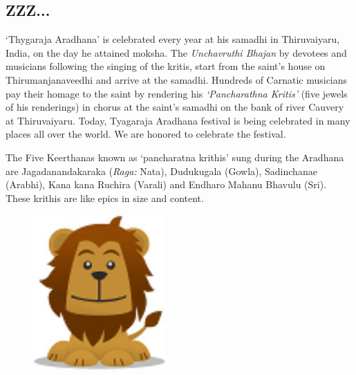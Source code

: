 \documentclass[10pt,letterpaper,twocolumn,landscape]{article}
\begin{document}
\begin{framed}
\section*{ZZZ...}
`Thygaraja Aradhana' is celebrated every year 
at his samadhi in Thiruvaiyaru, India, on the day he attained moksha. 
The {\em Unchavruthi Bhajan} by devotees and musicians 
following the singing of the kritis, start from 
the saint's house on Thirumanjanaveedhi and arrive 
at the samadhi.
Hundreds of Carnatic musicians pay their homage to 
the saint by rendering his {\em {\large `Pancharathna Kritis'}} 
(five jewels of his renderings) in chorus at the 
saint's samadhi on the bank of river
Cauvery at Thiruvaiyaru. Today, Tyagaraja Aradhana 
festival is being celebrated in many places all over the world.
We are honored to celebrate the festival. 

The Five Keerthanas known as ‘pancharatna krithis’ 
sung during the Aradhana are Jagadanandakaraka ({\em Raga:} Nata), 
Dudukugala (Gowla), Sadinchanae (Arabhi), 
Kana kana Ruchira (Varali) and Endharo Mahanu Bhavulu (Sri).
These krithis are like epics in size and content.


\end{framed}


\begin{figure}[h]
\begin{center}
\includegraphics[width=2in]{logo.png}
\end{center}
\end{figure}


\begin{figure}[b]
\begin{center}
\end{center}
\end{figure}
\end{document}
